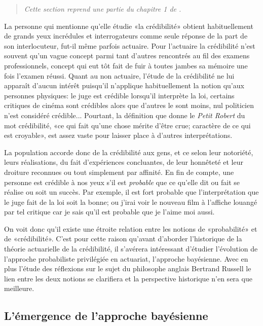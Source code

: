 \begin{quote}
  \itshape Cette section reprend une partie du chapitre 1 de
  \cite{Goulet:masters}.
\end{quote}

La personne qui mentionne qu'elle étudie «la crédibilité» obtient
habituellement de grands yeux incrédules et interrogateurs comme seule
réponse de la part de son interlocuteur, fut-il même parfois actuaire.
Pour l'actuaire la crédibilité n'est souvent qu'un vague concept parmi
tant d'autres rencontrés au fil des examens professionnels, concept
qui eut tôt fait de fuir à toutes jambes sa mémoire une fois l'examen
réussi. Quant au non actuaire, l'étude de la crédibilité ne lui
apparaît d'aucun intérêt puisqu'il n'applique habituellement la notion
qu'aux personnes physiques: le juge est crédible lorsqu'il interprète
la loi, certains critiques de cinéma sont crédibles alors que d'autres
le sont moins, nul politicien n'est considéré crédible... Pourtant, la
définition que donne le \emph{Petit Robert} du mot crédibilité, «ce
qui fait qu'une chose mérite d'être crue; caractère de ce qui est
croyable», est assez vaste pour laisser place à d'autres
interprétations.

La population accorde donc de la crédibilité aux gens, et ce selon
leur notoriété, leurs réalisations, du fait d'expériences concluantes,
de leur honnêteté et leur droiture reconnues ou tout simplement par
affinité. En fin de compte, une personne est crédible à nos yeux s'il
est \emph{probable} que ce qu'elle dit ou fait se réalise ou soit un
succès. Par exemple, il est fort probable que l'interprétation que le
juge fait de la loi soit la bonne; ou j'irai voir le nouveau film à
l'affiche louangé par tel critique car je sais qu'il est probable que
je l'aime moi aussi.

On voit donc qu'il existe une étroite relation entre les notions de
«probabilité» et de «crédibilité». C'est pour cette raison qu'avant
d'aborder l'historique de la théorie actuarielle de la crédibilité, il
s'avérera intéressant d'étudier l'évolution de l'approche probabiliste
privilégiée en actuariat, l'approche bayésienne. Avec en plus l'étude
des réflexions sur le sujet du philosophe anglais Bertrand Russell le
lien entre les deux notions se clarifiera et la perspective historique
n'en sera que meilleure.

\subsection{L'émergence de l'approche bayésienne}

